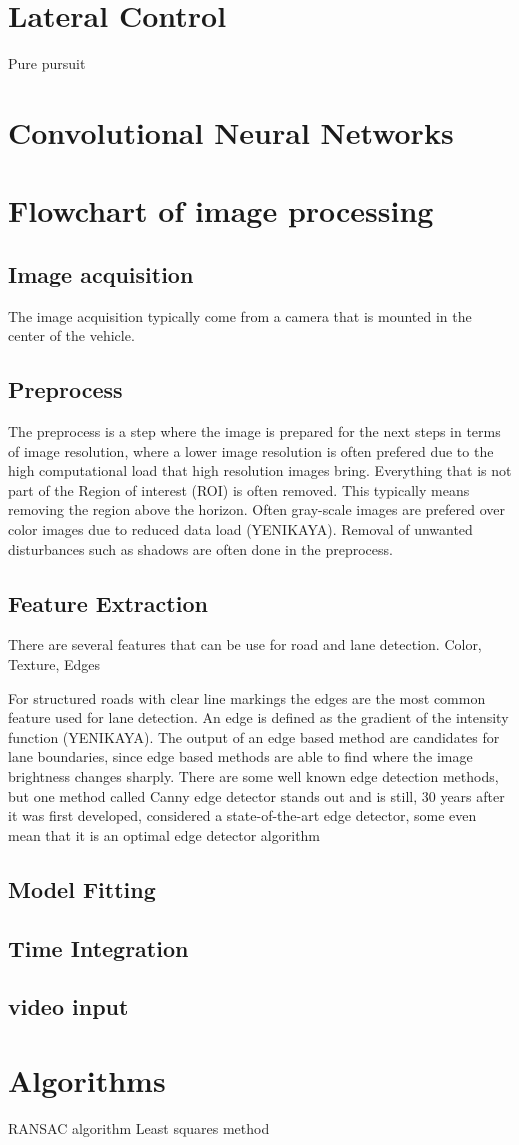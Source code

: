 \section{Lateral Control}
Pure pursuit
\section{Convolutional Neural Networks}


\section{Flowchart of image processing}
\subsection{Image acquisition}
The image acquisition typically come from a camera that is mounted in the center of the vehicle. 
\subsection{Preprocess}
The preprocess is a step where the image is prepared for the next steps in terms of image resolution, where a lower image resolution is often prefered due to the high computational load that high resolution images bring. Everything that is not part of the Region of interest (ROI) is often removed. This typically means removing the region above the horizon. Often gray-scale images are prefered over color images due to reduced data load (YENIKAYA). Removal of unwanted disturbances such as shadows are often done in the preprocess. 
\subsection{Feature Extraction}
There are several features that can be use for road and lane detection. Color, Texture, Edges

For structured roads with clear line markings the edges are the most common feature used for lane detection. An edge is defined as the gradient of the intensity function (YENIKAYA). The output of an edge based method are candidates for lane boundaries, since edge based methods are able to find where the image brightness changes sharply. There are some well known edge detection methods, but one method called Canny edge detector stands out and is still, 30 years after it was first developed, considered a state-of-the-art edge detector, some even mean that it is an optimal edge detector algorithm \cite{bhadauria2013comparison}

\subsection{Model Fitting}
\subsection{Time Integration}
\subsection{video input}
\section{Algorithms}
RANSAC algorithm
Least squares method
